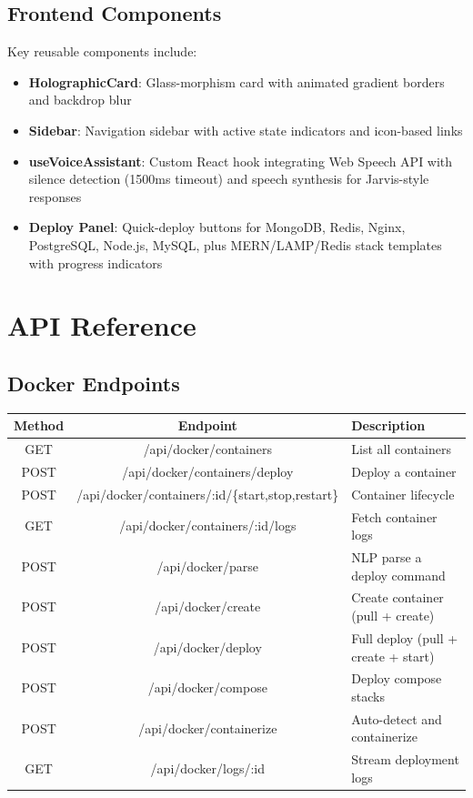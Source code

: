 \documentclass[12pt,a4paper]{report}
\begin{document}
\section{Frontend Components}
Key reusable components include:
\begin{itemize}
  \item \textbf{HolographicCard}: Glass-morphism card with animated gradient borders and backdrop blur
  \item \textbf{Sidebar}: Navigation sidebar with active state indicators and icon-based links
  \item \textbf{useVoiceAssistant}: Custom React hook integrating Web Speech API with silence detection (1500ms timeout) and speech synthesis for Jarvis-style responses
  \item \textbf{Deploy Panel}: Quick-deploy buttons for MongoDB, Redis, Nginx, PostgreSQL, Node.js, MySQL, plus MERN/LAMP/Redis stack templates with progress indicators
\end{itemize}

\chapter{API Reference}

\section{Docker Endpoints}
\begin{table}[H]
\centering
\small
\begin{tabularx}{\textwidth}{c c X}
\toprule
\textbf{Method} & \textbf{Endpoint} & \textbf{Description} \\
\midrule
GET & /api/docker/containers & List all containers \\
POST & /api/docker/containers/deploy & Deploy a container \\
POST & /api/docker/containers/:id/\{start,stop,restart\} & Container lifecycle \\
GET & /api/docker/containers/:id/logs & Fetch container logs \\
POST & /api/docker/parse & NLP parse a deploy command \\
POST & /api/docker/create & Create container (pull + create) \\
POST & /api/docker/deploy & Full deploy (pull + create + start) \\
POST & /api/docker/compose & Deploy compose stacks \\
POST & /api/docker/containerize & Auto-detect and containerize \\
GET & /api/docker/logs/:id & Stream deployment logs \\
\bottomrule
\end{tabularx}
\end{table}
\end{document}
